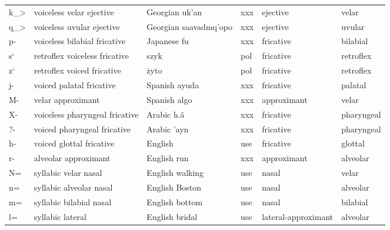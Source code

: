 {\begin{longtable}{l|p{.3\linewidth}|p{.15\linewidth}|l|p{.15\linewidth}|l}
	k\_\textgreater	& voiceless velar ejective	& Georgian uk'an	& xxx	& ejective	& velar	\\
	q\_\textgreater	& voiceless uvular ejective	& Georgian saavadmq'opo	& xxx	& ejective	& uvular\\
	p-	& voiceless bilabial fricative	& Japanese fu	& xxx	& fricative	& bilabial	\\
	s`	& retroflex voiceless fricative	& szyk	& pol	& fricative	& retroflex	\\
	z`	& retroflex voiced fricative	& żyto	& pol	& fricative	& retroflex	\\
	j-	& voiced palatal fricative	& Spanish ayuda	& xxx	& fricative	& palatal	\\
	M-	& velar approximant	& Spanish algo	& xxx	& approximant	& velar	\\
	X-	& voiceless pharyngeal fricative	& Arabic h.â	& xxx	& fricative	& pharyngeal	\\
	?-	& voiced pharyngeal fricative	& Arabic 'ayn	& xxx	& fricative	& pharyngeal	\\
	h-	& voiced glottal fricative	& English	& use	& fricative	& glottal	\\
	r-	& alveolar approximant	& English run	& xxx	& approximant	& alveolar	\\
	N=	& syllabic velar nasal	& English walking	& use	& nasal	& velar	\\
	n=	& syllabic alveolar nasal	& English Boston	& use	& nasal	& alveolar	\\
	m=	& syllabic bilabial nasal	& English bottom	& use	& nasal	& bilabial	\\
	l=	& syllabic lateral	& English bridal	& use	& lateral-approximant	& alveolar	\\
\end{longtable}
}

\newpage
